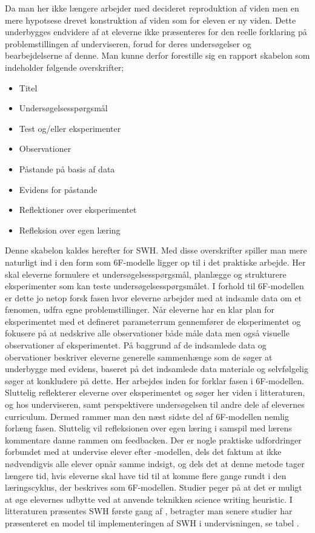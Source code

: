 Da man her ikke længere arbejder med decideret reproduktion af viden men en mere hypotsese drevet konstruktion af viden som for eleven er ny viden. Dette underbygges endvidere af at eleverne ikke præsenteres for den reelle forklaring på problemstillingen af underviseren, forud for deres undersøgelser og bearbejdelserne af denne.  Man kunne derfor forestille sig en rapport skabelon som indeholder følgende overskrifter;
\begin{itemize}
	\item Titel\vspace{-15pt}
	\item Undersøgelsesspørgsmål\vspace{-15pt}
	\item Test og/eller eksperimenter\vspace{-15pt}
	\item Observationer\vspace{-15pt}
	\item Påstande på basis af data\vspace{-15pt}
	\item Evidens for påstande\vspace{-15pt}
	\item Reflektioner over eksperimentet\vspace{-15pt}
	\item Refleksion over egen læring
\end{itemize}
Denne skabelon kaldes herefter for SWH. Med disse overskrifter spiller man mere naturligt ind i den form som 6F-modelle ligger op til i det praktiske arbejde. Her skal eleverne formulere et undersøgelsesspørgsmål, planlægge og strukturere eksperimenter som kan teste undersøgelsesspørgsmålet. I forhold til 6F-modellen er dette jo netop forsk fasen hvor eleverne arbejder med at indsamle data om et fænomen, udfra egne problemstillinger. Når eleverne har en klar plan for eksperimentet med et defineret parameterrum gennemfører de eksperimentet og fokusere på at nedskrive alle observationer både måle data men også visuelle observationer af eksperimentet. På baggrund af de indsamlede data og obervationer beskriver eleverne generelle sammenhænge som de søger at underbygge med evidens, baseret på det indsamlede data materiale og selvfølgelig søger at konkludere på dette. Her arbejdes inden for forklar fasen i 6F-modellen. Sluttelig reflekterer eleverne over eksperimentet og søger her viden i litteraturen, og hos underviseren, samt perspektivere undersøgelsen til andre dele af elevernes curriculum. Dermed rammer man den næst sidste del af 6F-modellen nemlig forlæng fasen. Sluttelig vil refleksionen over egen læring i samspil med lærens kommentare danne rammen om feedbacken. Der er nogle praktiske udfordringer forbundet med at undervise elever efter \ib-modellen, dels det faktum at ikke nødvendigvis alle elever opnår samme indsigt, og dels det at denne metode tager længere tid, hvis eleverne skal have tid til at komme flere gange rundt i den læringscyklus, der beskrives som 6F-modellen. Studier peger på at det er muligt at øge elevernes udbytte ved at anvende teknikken science writing heuristic. I litteraturen præsentes SWH første gang af \citep{Keys1999}, betragter man senere studier har \citep{Hand2004} præsenteret en model til implementeringen af SWH i undervisningen, se tabel .

